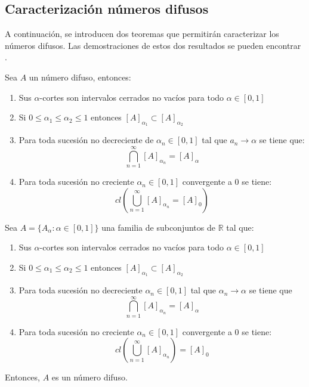 
  \subsection{Caracterización números difusos}
  A continuación, se introducen dos teoremas que permitirán caracterizar los números difusos. Las demostraciones de estos dos resultados se pueden encontrar \cite{apuntesfuzzy}.

  \begin{teorema}
    Sea $A$ un número difuso, entonces:
    \begin{enumerate}
    \item Sus $\alpha$-cortes son intervalos cerrados no vacíos para todo $\alpha \in [0, 1]$
    \item Si $0 \leq \alpha_1 \leq \alpha_2 \leq 1$ entonces $[A]_{\alpha_1} \subset [A]_{\alpha_2}$
    \item Para toda sucesión no decreciente de $\alpha_n \in [0, 1]$ tal que $a_n \longrightarrow \alpha$ se tiene que:
      \[
      \bigcap^\infty_{n=1} [A]_{\alpha_n} = [A]_\alpha
      \]
    \item Para toda sucesión no creciente $\alpha_n \in [0, 1]$ convergente a $0$ se tiene:
      \[
      cl\left(
      \bigcup^\infty_{n=1} [A]_{\alpha_n} = [A]_0
      \right)
      \]
    \end{enumerate}
  \end{teorema}

  \begin{teorema}
    Sea $A=\{A_\alpha : \alpha \in [0, 1]\}$ una familia de subconjuntos de $\mathbb{R}$ tal que:
    
    \begin{enumerate}
    \item Sus $\alpha$-cortes son intervalos cerrados no vacíos para todo $\alpha \in [0, 1]$
    \item Si $0 \leq \alpha_1 \leq \alpha_2 \leq 1$ entonces $[A]_{\alpha_1} \subset [A]_{\alpha_2}$
    \item Para toda sucesión no decreciente $\alpha_n \in [0, 1]$ tal que $\alpha_n \longrightarrow \alpha$ se tiene que
      $$
      \bigcap^\infty_{n=1} [A]_{\alpha_n}=[A]_\alpha
      $$
    \item Para toda sucesión no creciente $\alpha_n \in [0, 1]$ convergente a $0$ se tiene:
      $$
      cl\left(\bigcup^\infty_{n=1} [A]_{\alpha_n}\right)=[A]_0
      $$
    \end{enumerate}
    Entonces, $A$ es un número difuso.
  \end{teorema}


